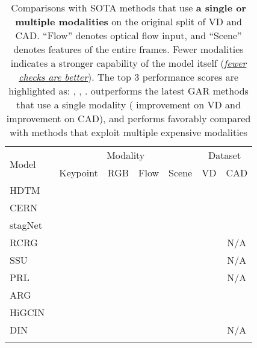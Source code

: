 \documentclass[runningheads]{llncs}
\begin{document}
 
\setlength{\tabcolsep}{4pt}
\begin{table}[t]
\fontsize{7.5pt}{7.5pt}\selectfont
\begin{center}
\caption{Comparisons with SOTA methods that use \textbf{a single or multiple modalities} on the original split of VD and CAD.
 ``Flow'' denotes optical flow input, and ``Scene'' denotes
 features of the entire frames. Fewer modalities 
indicates a stronger capability of the model itself (\textit{\ul{fewer checks are better}}). 
The top 3 performance scores are highlighted as:
\textbf{}, , . 
\ours outperforms the latest GAR methods that use a single modality ( improvement on VD and  improvement on CAD), and performs favorably compared with methods that exploit multiple expensive modalities
  }
\label{table:vd_cad}
\begin{tabular}{l|c|c|c|c|c|c}
\hline
\multirow{2}{*}{Model} &  \multicolumn{4}{c|}{Modality}  &  \multicolumn{2}{c}{Dataset}     \\  \cline{2-7} 
      &   Keypoint  &  RGB   &   Flow   &    Scene    & VD   & CAD     \\ \hline\hline  \rowcolor{aureolin!10}
HDTM~\cite{ibrahim2016hierarchical}     &    &   \tablecheck{\CheckmarkBold}   &      &        &       &        \\ \hline \rowcolor{aureolin!10}
CERN~\cite{cern} &     &    \tablecheck{\CheckmarkBold}    &      &        &     &   \\ \hline \rowcolor{aureolin!10}
stagNet~\cite{stagnet}  &     &     \tablecheck{\CheckmarkBold}   &      &        &     &    \\ \hline \rowcolor{aureolin!10}
RCRG~\cite{rcrg}   &     &     \tablecheck{\CheckmarkBold}   &      &        &     &  N/A    \\ \hline \rowcolor{aureolin!10}
SSU~\cite{ssu}    &     &     \tablecheck{\CheckmarkBold}   &      &        &      &  N/A    \\ \hline \rowcolor{aureolin!10}
PRL~\cite{prl}     &     &     \tablecheck{\CheckmarkBold}   &      &        &       &  N/A    \\ \hline \rowcolor{aureolin!10}
ARG~\cite{arg}  &     &    \tablecheck{\CheckmarkBold}  &      &        &     &    \\ \hline \rowcolor{aureolin!10}
HiGCIN~\cite{higcin} &     &   \tablecheck{\CheckmarkBold}  &      &        &     &     \\ \hline \rowcolor{aureolin!10}
DIN~\cite{yuan2021spatio} &     &  \tablecheck{\CheckmarkBold}    &      &        &     & N/A   \\ \hline\hline \rowcolor{ballblue!10}

\end{tabular}
\end{center}
\end{table}
\end{document}
